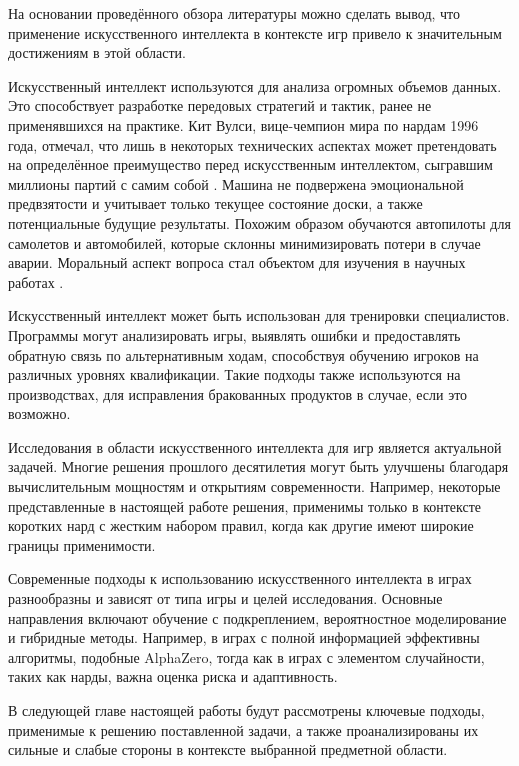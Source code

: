 На основании проведённого обзора литературы можно сделать вывод, что применение искусственного интеллекта в контексте игр привело к значительным достижениям в этой области.

Искусственный интеллект используются для анализа огромных объемов данных. Это способствует разработке передовых стратегий и тактик, ранее не применявшихся на практике. Кит Вулси, вице-чемпион мира по нардам 1996 года, отмечал, что лишь в некоторых технических аспектах может претендовать на определённое преимущество перед искусственным интеллектом, сыгравшим миллионы партий с самим собой \cite{kitwoolsey}. Машина не подвержена эмоциональной предвзятости и учитывает только текущее состояние доски, а также потенциальные будущие результаты. Похожим образом обучаются автопилоты для самолетов и автомобилей, которые склонны минимизировать потери в случае аварии. Моральный аспект вопроса стал объектом для изучения в научных работах \cite{moralaspects}.

Искусственный интеллект может быть использован для тренировки специалистов. Программы могут анализировать игры, выявлять ошибки и предоставлять обратную связь по альтернативным ходам, способствуя обучению игроков на различных уровнях квалификации. Такие подходы также используются на производствах, для исправления бракованных продуктов в случае, если это возможно.

Исследования в области искусственного интеллекта для игр является актуальной задачей. Многие решения прошлого десятилетия могут быть улучшены благодаря вычислительным мощностям и открытиям современности. Например, некоторые представленные в настоящей работе решения, применимы только в контексте коротких нард с жестким набором правил, когда как другие имеют широкие границы применимости.

Современные подходы к использованию искусственного интеллекта в играх разнообразны и зависят от типа игры и целей исследования. Основные направления включают обучение с подкреплением, вероятностное моделирование и гибридные методы. Например, в играх с полной информацией эффективны алгоритмы, подобные AlphaZero, тогда как в играх с элементом случайности, таких как нарды, важна оценка риска и адаптивность.

В следующей главе настоящей работы будут рассмотрены ключевые подходы, применимые к решению поставленной задачи, а также проанализированы их сильные и слабые стороны в контексте выбранной предметной области.
